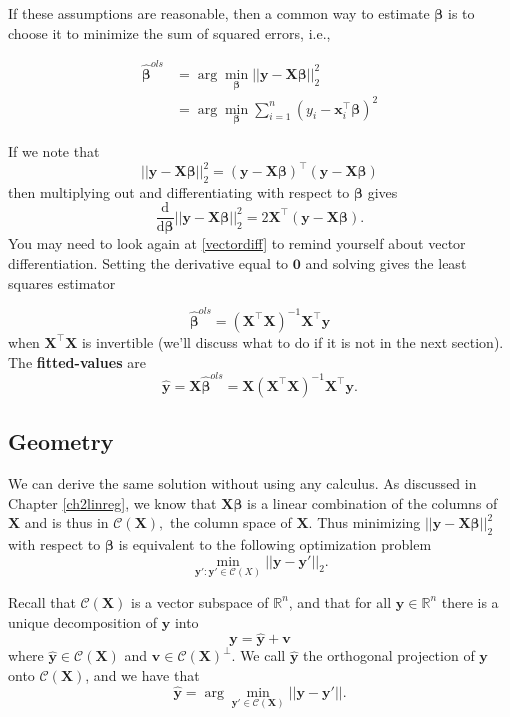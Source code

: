 \documentclass[
]{book}
\theoremstyle{definition}
\theoremstyle{definition}
\theoremstyle{definition}
\theoremstyle{definition}
\theoremstyle{remark}
\begin{document}
If these assumptions are reasonable, then
a common way to estimate \(\boldsymbol \beta\) is to choose it to minimize the sum of squared errors, i.e.,

\begin{align*}
{\hat{\boldsymbol \beta}}^{ols} &= \arg \min_{\boldsymbol \beta} || \mathbf y- \mathbf X\boldsymbol \beta||_2^2\\
&= \arg \min_{\boldsymbol \beta} \sum_{i=1}^n (y_i - \mathbf x_i^\top \boldsymbol \beta)^2
\end{align*}

If we note that
\[|| \mathbf y- \mathbf X\boldsymbol \beta||_2^2 = (\mathbf y-\mathbf X\boldsymbol \beta)^\top(\mathbf y-\mathbf X\boldsymbol \beta) \]
then multiplying out and differentiating with respect to \(\boldsymbol \beta\) gives
\[\frac{\mathrm d}{\mathrm d\boldsymbol \beta} || \mathbf y- \mathbf X\boldsymbol \beta||_2^2 = 2\mathbf X^\top (\mathbf y- \mathbf X\boldsymbol \beta).\]
You may need to look again at \ref{vectordiff} to remind yourself about vector differentiation. Setting the derivative equal to \(\boldsymbol 0\) and solving gives the least squares estimator

\begin{equation}
\hat{\boldsymbol \beta}^{ols}=\left (\mathbf X^\top \mathbf X\right )^{-1}\mathbf X^\top \mathbf y
\label{eq:uni1}
\end{equation}
when \(\mathbf X^\top \mathbf X\) is invertible (we'll discuss what to do if it is not in the next section).
The \textbf{fitted-values} are \[\hat{\mathbf y}= \mathbf X\hat{\boldsymbol \beta}^{ols}=\mathbf X(\mathbf X^\top \mathbf X)^{-1}\mathbf X^\top \mathbf y.\]

\hypertarget{geometry}{%
\subsection{Geometry}\label{geometry}}

We can derive the same solution without using any calculus.
As discussed in Chapter \ref{ch2linreg}, we know that \(\mathbf X\boldsymbol \beta\) is a linear combination of the columns of \(\mathbf X\) and is thus in \(\mathcal{C}(\mathbf X),\) the column space of \(\mathbf X\). Thus minimizing \(||\mathbf y- \mathbf X\boldsymbol \beta||_2^2\) with respect to \(\boldsymbol \beta\) is equivalent to the following optimization problem \[\min_{\mathbf y': \mathbf y' \in \mathcal{C}(X)} ||\mathbf y-\mathbf y'||_2.\]

Recall that \(\mathcal{C}(\mathbf X)\) is a vector subspace of \(\mathbb{R}^n\), and that for all \(\mathbf y\in \mathbb{R}^n\) there is a unique decomposition of \(\mathbf y\) into
\[\mathbf y= \hat{\mathbf y} + \mathbf v\]
where \(\hat{\mathbf y}\in \mathcal{C}(\mathbf X)\) and \(\mathbf v\in \mathcal{C}(\mathbf X)^\perp\). We call \(\hat{\mathbf y}\) the orthogonal projection of \(\mathbf y\) onto \(\mathcal{C}(\mathbf X)\), and we have that
\[\hat{\mathbf y}=\arg \min_{\mathbf y' \in \mathcal{C}(\mathbf X)}||\mathbf y- \mathbf y'||.\]
\end{document}
